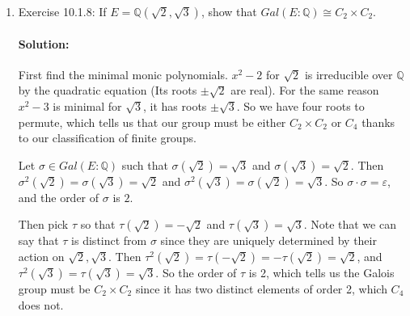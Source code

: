 \documentclass{article}
\begin{document}
\begin{enumerate}
\item Exercise 10.1.8: If $E= {\mathbb Q}(\sqrt{2}, \sqrt{3} )$, show that $Gal(E:{\mathbb Q})\cong C_2\times C_2$.

    \paragraph{Solution:} First find the minimal monic polynomials. $x^2-2$ for $\sqrt{2} $ is 
    irreducible over $\mathbb{Q}$ by the quadratic equation (Its roots $\pm \sqrt{2} $ are real). For the 
    same reason $x^2-3$ is minimal for $\sqrt{3}$, it has roots $\pm\sqrt{3} $. So we have 
    four roots to permute, which tells us that our group must be either $C_2\times C_2$ or $C_4$ thanks
    to our classification of finite groups.

    Let $\sigma \in Gal(E:\mathbb{Q})$ such that $\sigma(\sqrt{2})=\sqrt{3}$ and 
    $\sigma(\sqrt{3} )=\sqrt{2} $. Then $\sigma^2(\sqrt{2} ) =\sigma(\sqrt{3})=\sqrt{2}$
    and $\sigma^2(\sqrt{3} )=\sigma(\sqrt{2} )=\sqrt{3} $. So $\sigma\cdot \sigma=\varepsilon$, and
    the order of $\sigma$ is $2$.

    Then pick $\tau$ so that $\tau(\sqrt{2})=-\sqrt{2} $ and $\tau(\sqrt{3})=\sqrt{3} $. Note that we
    can say that $\tau$ is distinct from $\sigma$ since they are uniquely determined by their action
    on $\sqrt{2} ,\sqrt{3} $. Then $\tau^2(\sqrt{2})=\tau(-\sqrt{2} ) =-\tau(\sqrt{2} )=\sqrt{2} $, and 
    $\tau^2(\sqrt{3})=\tau(\sqrt{3} )=\sqrt{3} $. So the order of $\tau$ is 2, which tells us the Galois
    group must be $C_2\times C_2$ since it has two distinct elements of order 2, which $C_4$ does not.

\end{enumerate}
\end{document}
